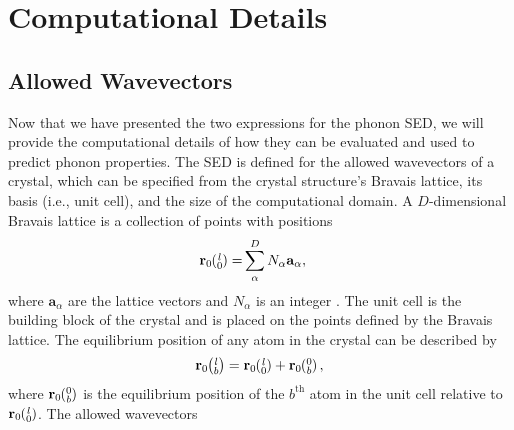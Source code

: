 \section{\label{Section_Comp}Computational Details}
\subsection{\label{Subsection_Comp_Details_1}Allowed Wavevectors}
Now that we have presented the two expressions for the phonon SED, we will 
provide the computational details of how they can be evaluated and used 
to predict 
phonon properties. The SED is defined for the allowed wavevectors of a 
crystal, which can 
be specified from the crystal structure's Bravais lattice, its basis (i.e., 
unit cell), and 
the size of the computational domain. A $D$-dimensional Bravais lattice 
is a collection of 
points with
positions
\begin{equation}\label{crys_pos}
\begin{split}
\mathbf{r}_0\ab{l}{0} =& \sum^D_{\alpha} N_{\alpha}\mathbf{a}_{\alpha},
\end{split}
\end{equation}
where $\mathbf{a}_{\alpha}$ are the lattice vectors and $N_{\alpha}$ is 
an integer 
\cite{dove_introduction_1993}.
The unit cell is the building block of 
the crystal and is placed on the 
points defined by the Bravais lattice. The equilibrium position of any 
atom in the crystal 
can be described by
\begin{equation}\label{crys_pos2}
\begin{split}
\mathbf{r}_0\ab{l}{b} = \mathbf{r}_0\ab{l}{0} + \mathbf{r}_0\ab{0}{b},
\end{split}
\end{equation}
where $\mathbf{r}_0\ab{0}{b}$ is the equilibrium position of the 
$b^{\textrm{th}}$ atom in 
the unit cell relative to $\mathbf{r}_0\ab{l}{0}$. 
The allowed wavevectors 
